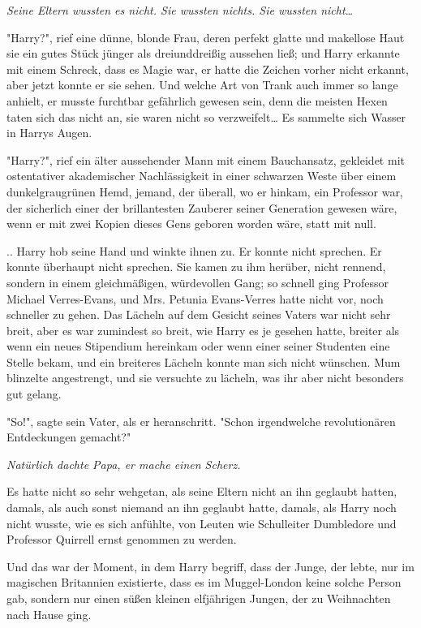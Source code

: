 {\emph{Seine Eltern wussten es nicht. Sie wussten nichts. Sie wussten nicht…}

"Harry?", rief eine dünne, blonde Frau, deren perfekt glatte und makellose Haut sie ein gutes Stück jünger als dreiunddreißig aussehen ließ; und Harry erkannte mit einem Schreck, dass es Magie war, er hatte die Zeichen vorher nicht erkannt, aber jetzt konnte er sie sehen. Und welche Art von Trank auch immer so lange anhielt, er musste furchtbar gefährlich gewesen sein, denn die meisten Hexen taten sich das nicht an, sie waren nicht so verzweifelt… Es sammelte sich Wasser in Harrys Augen.

"Harry?", rief ein älter aussehender Mann mit einem Bauchansatz, gekleidet mit ostentativer akademischer Nachlässigkeit in einer schwarzen Weste über einem dunkelgraugrünen Hemd, jemand, der überall, wo er hinkam, ein Professor war, der sicherlich einer der brillantesten Zauberer seiner Generation gewesen wäre, wenn er mit zwei Kopien dieses Gens geboren worden wäre, statt mit null.

.. Harry hob seine Hand und winkte ihnen zu. Er konnte nicht sprechen. Er konnte überhaupt nicht sprechen. Sie kamen zu ihm herüber, nicht rennend, sondern in einem gleichmäßigen, würdevollen Gang; so schnell ging Professor Michael Verres-Evans, und Mrs. Petunia Evans-Verres hatte nicht vor, noch schneller zu gehen. Das Lächeln auf dem Gesicht seines Vaters war nicht sehr breit, aber es war zumindest so breit, wie Harry es je gesehen hatte, breiter als wenn ein neues Stipendium hereinkam oder wenn einer seiner Studenten eine Stelle bekam, und ein breiteres Lächeln konnte man sich nicht wünschen. Mum blinzelte angestrengt, und sie versuchte zu lächeln, was ihr aber nicht besonders gut gelang.

"So!", sagte sein Vater, als er heranschritt. "Schon irgendwelche revolutionären Entdeckungen gemacht?"

\emph{Natürlich dachte Papa, er mache einen Scherz.}

Es hatte nicht so sehr wehgetan, als seine Eltern nicht an ihn geglaubt hatten, damals, als auch sonst niemand an ihn geglaubt hatte, damals, als Harry noch nicht wusste, wie es sich anfühlte, von Leuten wie Schulleiter Dumbledore und Professor Quirrell ernst genommen zu werden.

Und das war der Moment, in dem Harry begriff, dass der Junge, der lebte, nur im magischen Britannien existierte, dass es im Muggel-London keine solche Person gab, sondern nur einen süßen kleinen elfjährigen Jungen, der zu Weihnachten nach Hause ging.

}

